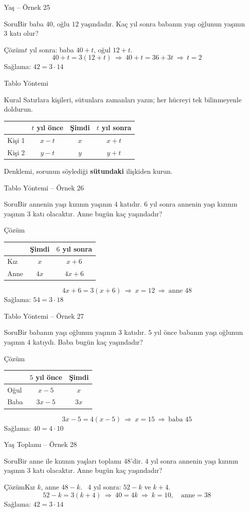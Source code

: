 \documentclass[aspectratio=169,11pt,handout]{beamer}
\newcommand{\soru}[3]{%
\begin{frame}{#1}
  \begin{block}{Soru}\large #2\end{block}
  \pause
  \begin{exampleblock}{Çözüm}\large #3\end{exampleblock}
\end{frame}}
\begin{document}
\soru{Yaş -- Örnek 25}
{Bir baba \(40\), oğlu \(12\) yaşındadır. Kaç yıl sonra babanın yaşı oğlunun yaşının \(3\) katı olur?}
{\(t\) yıl sonra: baba \(40+t\), oğul \(12+t\).
\[40+t=3(12+t)\ \Rightarrow\ 40+t=36+3t\ \Rightarrow\ t=2\]
Sağlama: \(42=3\cdot 14\) \checkmark}

\begin{frame}{Tablo Yöntemi}
\begin{block}{Kural}
Satırlara kişileri, sütunlara zamanları yazın; her hücreyi tek bilinmeyenle doldurun.
\begin{center}
\renewcommand{\arraystretch}{1.25}
\begin{tabular}{lccc}
\toprule
 & \(t\) yıl önce & Şimdi & \(t\) yıl sonra\\\midrule
Kişi 1 & \(x-t\) & \(x\) & \(x+t\)\\
Kişi 2 & \(y-t\) & \(y\) & \(y+t\)\\\bottomrule
\end{tabular}
\end{center}
Denklemi, sorunun söylediği \textbf{sütundaki} ilişkiden kurun.
\end{block}
\end{frame}

\soru{Tablo Yöntemi -- Örnek 26}
{Bir annenin yaşı kızının yaşının \(4\) katıdır. \(6\) yıl sonra annenin yaşı kızının yaşının \(3\) katı olacaktır. Anne bugün kaç yaşındadır?}
{\begin{tabular}{lcc}
 & Şimdi & \(6\) yıl sonra\\\hline
Kız & \(x\) & \(x+6\)\\
Anne & \(4x\) & \(4x+6\)
\end{tabular}
\[4x+6=3(x+6)\ \Rightarrow\ x=12\ \Rightarrow\ \text{anne } 48\]
Sağlama: \(54=3\cdot 18\) \checkmark}

\soru{Tablo Yöntemi -- Örnek 27}
{Bir babanın yaşı oğlunun yaşının \(3\) katıdır. \(5\) yıl önce babanın yaşı oğlunun yaşının \(4\) katıydı. Baba bugün kaç yaşındadır?}
{\begin{tabular}{lcc}
 & \(5\) yıl önce & Şimdi\\\hline
Oğul & \(x-5\) & \(x\)\\
Baba & \(3x-5\) & \(3x\)
\end{tabular}
\[3x-5=4(x-5)\ \Rightarrow\ x=15\ \Rightarrow\ \text{baba } 45\]
Sağlama: \(40=4\cdot 10\) \checkmark}

\soru{Yaş Toplamı -- Örnek 28}
{Bir anne ile kızının yaşları toplamı \(48\)'dir. \(4\) yıl sonra annenin yaşı kızının yaşının \(3\) katı olacaktır. Anne bugün kaç yaşındadır?}
{Kız \(k\), anne \(48-k\). \ \(4\) yıl sonra: \(52-k\) ve \(k+4\).
\[52-k=3(k+4)\ \Rightarrow\ 40=4k\ \Rightarrow\ k=10,\quad \text{anne}=38\]
Sağlama: \(42=3\cdot 14\) \checkmark}
\end{document}
